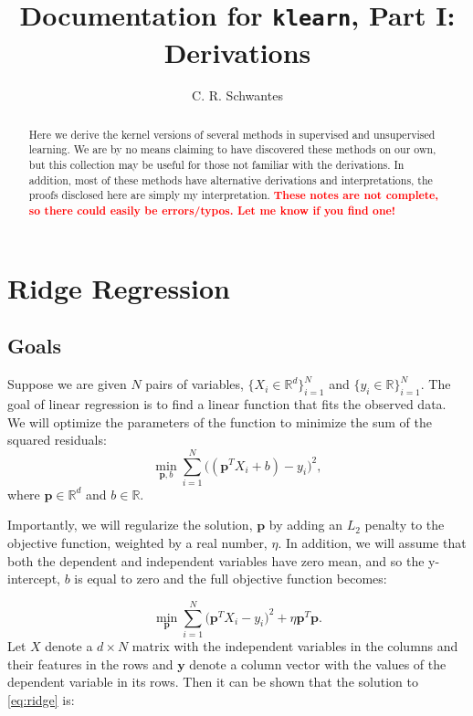 \documentclass[aip, jcp, url, amsmath, amssymb,
 longbibliography, nofootinbib,
reprint,
]{revtex4-1}
\begin{document}
\title{Documentation for {\tt \bf klearn}, Part I: Derivations}
\author{C. R. Schwantes}

\begin{abstract}
Here we derive the kernel versions of several methods in supervised and unsupervised learning. We are by no means claiming to have discovered these methods on our own, but this collection may be useful for those not familiar with the derivations. In addition, most of these methods have alternative derivations and interpretations, the proofs disclosed here are simply my interpretation. \textcolor{red}{\bf These notes are not complete, so there could easily be errors/typos. Let me know if you find one!}
\end{abstract}
\maketitle
\section{Ridge Regression}
\subsection{Goals}

Suppose we are given $N$ pairs of variables, $\{X_i \in \mathbb{R}^d\}_{i=1}^N$ and $\{y_i \in \mathbb{R}\}_{i=1}^N$. The goal of linear regression is to find a linear function that fits the observed data. We will optimize the parameters of the function to minimize the sum of the squared residuals:
\begin{equation}
\label{eq:least_squares}
\min_{\mathbf{p}, b} \sum_{i=1}^N \Big((\mathbf{p}^T X_i + b) - y_i\Big)^2,
\end{equation} where $\mathbf{p} \in \mathbb{R}^d$ and $b \in \mathbb{R}$. 

Importantly, we will regularize the solution, $\mathbf{p}$ by adding an $L_2$ penalty to the objective function, weighted by a real number, $\eta$. In addition, we will assume that both the dependent and independent variables have zero mean, and so the y-intercept, $b$ is equal to zero and the full objective function becomes:

\begin{equation}
\label{eq:ridge}
\min_{\mathbf{p}} \sum_{i=1}^N \Big(\mathbf{p}^T X_i - y_i\Big)^2 + \eta \mathbf{p}^T \mathbf{p}.
\end{equation} Let $X$ denote a $d \times N$ matrix with the independent variables in the columns and their features in the rows and $\mathbf{y}$ denote a column vector with the values of the dependent variable in its rows. Then it can be shown that the solution to \cref{eq:ridge} is:
\end{document}
